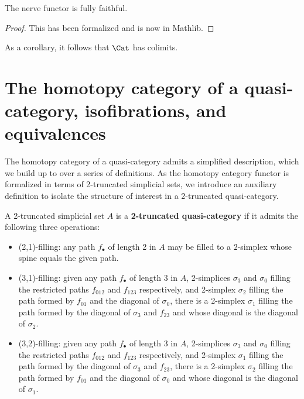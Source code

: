    \begin{proposition}\label{prop:nerve-fully-faithful}
     \leanok
    The nerve functor is fully faithful.
   \end{proposition}
   \begin{proof}
    \leanok
    This has been formalized and is now in Mathlib.
  \end{proof}

   As a corollary, it follows that $\Cat$ has colimits.

\section{The homotopy category of a quasi-category, isofibrations, and equivalences}\label{sec:homotopy-category}

   The homotopy category of a quasi-category admits a simplified description, which we build up to over a series of definitions. As the homotopy category functor is formalized in terms of 2-truncated simplicial sets, we introduce an auxiliary definition to isolate the structure of interest in a 2-truncated quasi-category.

   \begin{definition}\label{defn:2-truncated-qcat}
    \leanok
    A 2-truncated simplicial set $A$ is a \textbf{2-truncated quasi-category} if it admits the following three operations:
    \begin{itemize}
    \item (2,1)-filling: any path $f_\bullet$ of length 2 in $A$ may be filled to a $2$-simplex whose spine equals the given path.
    \item (3,1)-filling: given any path $f_\bullet$ of length 3 in $A$, 2-simplices $\sigma_3$ and $\sigma_0$ filling the restricted paths $f_{012}$ and $f_{123}$ respectively, and 2-simplex $\sigma_2$ filling the path formed by $f_{01}$ and the diagonal of $\sigma_0$, there is a 2-simplex $\sigma_1$ filling the path formed by the diagonal of $\sigma_3$ and $f_{23}$ and whose diagonal is the diagonal of $\sigma_2$.
    \item (3,2)-filling: given any path $f_\bullet$ of length 3 in $A$, 2-simplices $\sigma_3$ and $\sigma_0$ filling the restricted paths $f_{012}$ and $f_{123}$ respectively, and 2-simplex $\sigma_1$ filling the path formed by the diagonal of $\sigma_3$ and $f_{23}$, there is a 2-simplex $\sigma_2$ filling the path formed by $f_{01}$ and the diagonal of $\sigma_0$ and whose diagonal is the diagonal of $\sigma_1$.
    \end{itemize}

   \end{definition}


